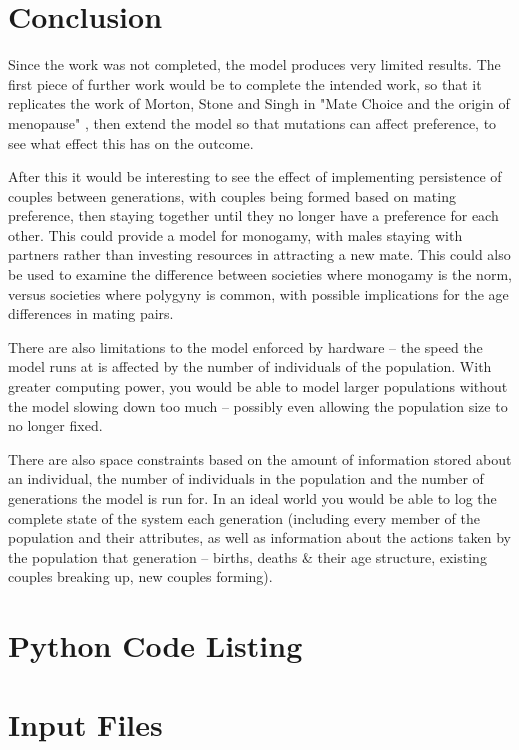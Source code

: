\documentclass[authoryearcitations]{UoYCSproject}
\begin{document}
\chapter{Conclusion}
\label{cha:Conclusion}
Since the work was not completed, the model produces very limited results. The first piece of further work would be to complete the intended work, so that it replicates the work of Morton, Stone and Singh in "Mate Choice and the origin of menopause" \cite{mateChoice2013}, then extend the model so that mutations can affect preference, to see what effect this has on the outcome. 

After this it would be interesting to see the effect of implementing persistence of couples between generations, with couples being formed based on mating preference, then staying together until they no longer have a preference for each other. This could provide a model for monogamy, with males staying with partners rather than investing resources in attracting a new mate. This could also be used to examine the difference between societies where monogamy is the norm, versus societies where polygyny is common, with possible implications for the age differences in mating pairs.

There are also limitations to the model enforced by hardware -- the speed the model runs at is affected by the number of individuals of the population. With greater computing power, you would be able to model larger populations without the model slowing down too much -- possibly even allowing the population size to no longer fixed. 

There are also space constraints based on the amount of information stored about an individual, the number of individuals in the population and the number of generations the model is run for. In an ideal world you would be able to log the complete state of the system each generation (including every member of the population and their attributes, as well as information about the actions taken by the population that generation -- births, deaths \& their age structure, existing couples breaking up, new couples forming). 



 

\appendix
\chapter{Python Code Listing}

\chapter{Input Files}
\end{document}
